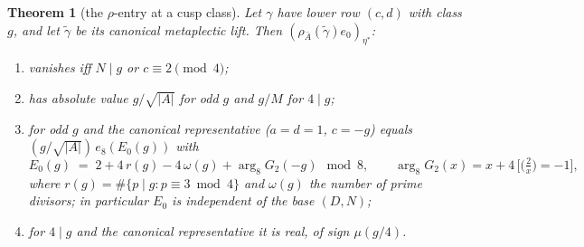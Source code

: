 \documentclass[11pt,reqno]{amsart}
\theoremstyle{plain}
\newtheorem{theorem}{Theorem}[section]
\theoremstyle{definition}
\begin{document}
\begin{theorem}[the $\rho$-entry at a cusp class]\label{thm:rhoentry}
Let $\gamma$ have lower row $(c,d)$ with class $g$, and let
$\widetilde\gamma$ be its canonical metaplectic lift. Then
$(\rho_{\bar A}(\widetilde\gamma)e_0)_{\eta^*}$:
\begin{enumerate}
\item vanishes iff $N\mid g$ or $c\equiv2\pmod4$;
\item has absolute value $g/\sqrt{|A|}$ for odd $g$ and $g/M$ for $4\mid g$;
\item for odd $g$ and the canonical representative ($a=d=1$, $c=-g$) equals
$(g/\sqrt{|A|})\,e_8(E_0(g))$ with
\[
  E_0(g)\;=\;2+4\,r(g)-4\,\omega(g)+\arg_8 G_2(-g)\ \bmod 8,\qquad
  \arg_8 G_2(x)=x+4\,\bigl[\bigl(\tfrac2x\bigr)=-1\bigr],
\]
where $r(g)=\#\{p\mid g:p\equiv3\bmod4\}$ and $\omega(g)$ the number of prime divisors;
in particular $E_0$ is independent of the base $(D,N)$;
\item for $4\mid g$ and the canonical representative it is real, of sign $\mu(g/4)$.
\end{enumerate}
\end{theorem}
\end{document}

